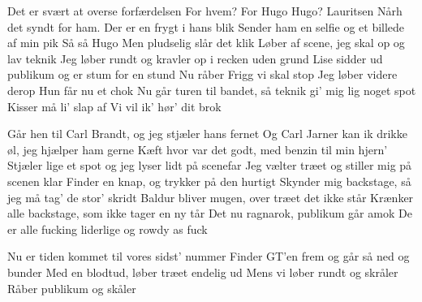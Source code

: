\documentclass[a4paper,11pt]{article}
\begin{document}
\begin{song}
Det er svært at overse forfærdelsen
For hvem?
For Hugo
Hugo?
Lauritsen
Nårh det syndt for ham. Der er en frygt i hans blik
Sender ham en selfie og et billede af min pik
Så så Hugo
Men pludselig slår det klik
Løber af scene, jeg skal op og lav teknik
Jeg løber rundt og kravler op i recken uden grund
Lise sidder ud publikum og er stum for en stund
Nu råber Frigg vi skal stop 
Jeg løber videre derop 
Hun får nu et chok
Nu går turen til bandet, så teknik gi' mig lig noget spot
Kisser må li' slap af 
Vi vil ik' hør' dit brok

Går hen til Carl Brandt, og jeg stjæler hans fernet
Og Carl Jarner kan ik drikke øl, jeg hjælper ham gerne
Kæft hvor var det godt, med benzin til min hjern'
Stjæler lige et spot og jeg lyser lidt på scenefar
Jeg vælter træet og stiller mig på scenen klar
Finder en knap, og trykker på den hurtigt
Skynder mig backstage, så jeg må tag' de stor' skridt
Baldur bliver mugen, over træet det ikke står
Krænker alle backstage, som ikke tager en ny tår
Det nu ragnarok, publikum går amok
De er alle fucking liderlige og rowdy as fuck

Nu er tiden kommet til vores sidst' nummer
Finder GT'en frem og går så ned og bunder
Med en blodtud, løber træet endelig ud
Mens vi løber rundt og skråler
Råber publikum og skåler
\end{song}
\end{document}
